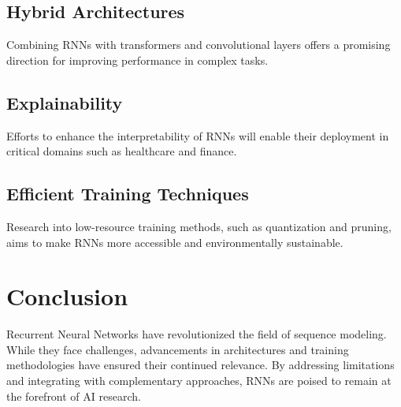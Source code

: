 \documentclass[12pt]{article}
\begin{document}
\subsection{Hybrid Architectures}
Combining RNNs with transformers and convolutional layers offers a promising direction for improving performance in complex tasks.

\subsection{Explainability}
Efforts to enhance the interpretability of RNNs will enable their deployment in critical domains such as healthcare and finance.

\subsection{Efficient Training Techniques}
Research into low-resource training methods, such as quantization and pruning, aims to make RNNs more accessible and environmentally sustainable.

\section{Conclusion}
Recurrent Neural Networks have revolutionized the field of sequence modeling. While they face challenges, advancements in architectures and training methodologies have ensured their continued relevance. By addressing limitations and integrating with complementary approaches, RNNs are poised to remain at the forefront of AI research.
\end{document}
